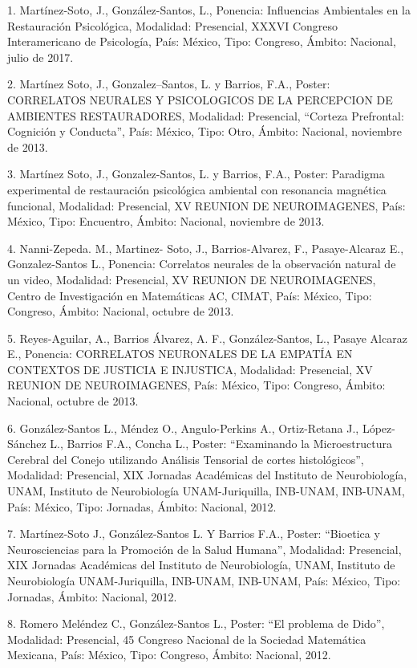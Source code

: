 1. Martínez-Soto, J., González-Santos, L., Ponencia: Influencias Ambientales en la Restauración 
Psicológica, Modalidad: Presencial, XXXVI Congreso Interamericano de Psicología, País: México, Tipo: 
Congreso, Ámbito: Nacional, julio de 2017.

2. Martínez Soto, J., Gonzalez--Santos, L. y Barrios, F.A., Poster: CORRELATOS NEURALES Y 
PSICOLOGICOS DE LA PERCEPCION DE AMBIENTES RESTAURADORES, Modalidad: Presencial, “Corteza 
Prefrontal: Cognición y Conducta”, País: México, Tipo: Otro, Ámbito: Nacional, noviembre de 2013.

3. Martínez Soto, J., Gonzalez-Santos, L. y Barrios, F.A., Poster: Paradigma experimental de 
restauración psicológica ambiental con resonancia magnética funcional, Modalidad: Presencial, XV 
REUNION DE NEUROIMAGENES, País: México, Tipo: Encuentro, Ámbito: Nacional, noviembre de 2013.

4. Nanni-Zepeda. M., Martinez- Soto, J., Barrios-Alvarez, F., Pasaye-Alcaraz E., Gonzalez-Santos L., 
Ponencia: Correlatos neurales de la observación natural de un video, Modalidad: Presencial, XV 
REUNION DE NEUROIMAGENES, Centro de Investigación en Matemáticas AC, CIMAT, País: México, Tipo: 
Congreso, Ámbito: Nacional, octubre de 2013.

5. Reyes-Aguilar, A., Barrios Álvarez, A. F., González-Santos, L., Pasaye Alcaraz E., Ponencia: 
CORRELATOS NEURONALES DE LA EMPATÍA EN CONTEXTOS DE JUSTICIA E INJUSTICA, Modalidad: Presencial, XV 
REUNION DE NEUROIMAGENES, País: México, Tipo: Congreso, Ámbito: Nacional, octubre de 2013.

6. González-Santos L., Méndez O., Angulo-Perkins A., Ortiz-Retana J., López-Sánchez L., Barrios 
F.A., Concha L., Poster: “Examinando la Microestructura Cerebral del Conejo utilizando Análisis 
Tensorial de cortes histológicos”, Modalidad: Presencial, XIX Jornadas Académicas del Instituto de 
Neurobiología, UNAM, Instituto de Neurobiología UNAM-Juriquilla, INB-UNAM, INB-UNAM, País: México, 
Tipo: Jornadas, Ámbito: Nacional, 2012.

7. Martínez-Soto J., González-Santos L. Y Barrios F.A., Poster: “Bioetica y Neurosciencias para la 
Promoción de la Salud Humana”, Modalidad: Presencial, XIX Jornadas Académicas del Instituto de 
Neurobiología, UNAM, Instituto de Neurobiología UNAM-Juriquilla, INB-UNAM, INB-UNAM, País: México, 
Tipo: Jornadas, Ámbito: Nacional, 2012.

8. Romero Meléndez C., González-Santos L., Poster: “El problema de Dido”, Modalidad: Presencial, 45 
Congreso Nacional de la Sociedad Matemática Mexicana, País: México, Tipo: Congreso, Ámbito: 
Nacional, 2012.

